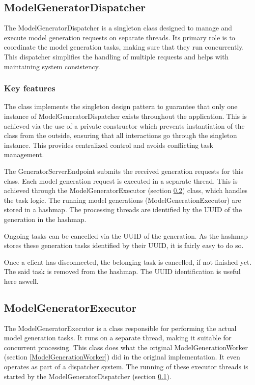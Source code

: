 		\subsection{ModelGeneratorDispatcher} \label{ModelGeneratorDispatcher}
			The ModelGeneratorDispatcher is a singleton class designed to manage and execute model generation requests on separate threads. 
			Its primary role is to coordinate the model generation tasks, making sure that they run concurrently. 
			This dispatcher simplifies the handling of multiple requests 
			and helps with maintaining system consistency.

			\subsubsection{Key features} \label{Key features}
			The class implements the singleton design pattern to guarantee that only one instance of ModelGeneratorDispatcher exists throughout the application. 
			This is achieved via the use of a private constructor which prevents instantiation of the class from the outside, ensuring 
			that all interactions go through the singleton instance.
			This provides centralized control and avoids conflicting task management.

			The GeneratorServerEndpoint submits the received generation requests for this class. 
			Each model generation request is executed in a separate thread. 
			This is achieved through the ModelGeneratorExecutor (section \ref{ModelGenerationExecutor}) class, which handles the task logic.
			The running model generations (ModelGenerationExecutor) are stored in a hashmap. The processing threads are identified by 
			the UUID of the generation in the hashmap.

			\label{servercanceldispatcher}Ongoing tasks can be cancelled via the UUID of the generation. As the hashmap stores these generation tasks identified by their UUID, it is fairly easy to do so.

			Once a client has disconnected, the belonging task is cancelled, if not finished yet. The said task is removed from the hashmap. The UUID identification is 
			useful here aswell.

		\subsection{ModelGeneratorExecutor}\label{ModelGenerationExecutor}
		The ModelGeneratorExecutor is a class responsible for performing the actual model generation tasks. It runs on a separate thread, 
		making it suitable for concurrent processing. This class does what the original ModelGenerationWorker 
		(section \ref{ModelGenerationWorker}) did in the original implementation. 
		It even operates as part of a dispatcher system. The running of these executor threads is started by the ModelGeneratorDispatcher 
		(section \ref{ModelGeneratorDispatcher}).

